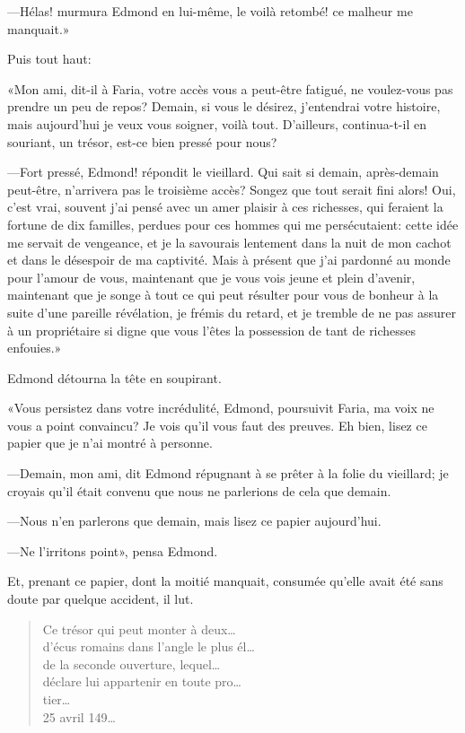 —Hélas! murmura Edmond en lui-même, le voilà retombé! ce malheur me manquait.»

Puis tout haut:

«Mon ami, dit-il à Faria, votre accès vous a peut-être fatigué, ne voulez-vous pas prendre un peu de repos? Demain, si vous le désirez, j'entendrai votre histoire, mais aujourd'hui je veux vous soigner, voilà tout. D'ailleurs, continua-t-il en souriant, un trésor, est-ce bien pressé pour nous?

—Fort pressé, Edmond! répondit le vieillard. Qui sait si demain, après-demain peut-être, n'arrivera pas le troisième accès? Songez que tout serait fini alors! Oui, c'est vrai, souvent j'ai pensé avec un amer plaisir à ces richesses, qui feraient la fortune de dix familles, perdues pour ces hommes qui me persécutaient: cette idée me servait de vengeance, et je la savourais lentement dans la nuit de mon cachot et dans le désespoir de ma captivité. Mais à présent que j'ai pardonné au monde pour l'amour de vous, maintenant que je vous vois jeune et plein d'avenir, maintenant que je songe à tout ce qui peut résulter pour vous de bonheur à la suite d'une pareille révélation, je frémis du retard, et je tremble de ne pas assurer à un propriétaire si digne que vous l'êtes la possession de tant de richesses enfouies.»

Edmond détourna la tête en soupirant.

«Vous persistez dans votre incrédulité, Edmond, poursuivit Faria, ma voix ne vous a point convaincu? Je vois qu'il vous faut des preuves. Eh bien, lisez ce papier que je n'ai montré à personne.

—Demain, mon ami, dit Edmond répugnant à se prêter à la folie du vieillard; je croyais qu'il était convenu que nous ne parlerions de cela que demain.

—Nous n'en parlerons que demain, mais lisez ce papier aujourd'hui.

—Ne l'irritons point», pensa Edmond.

Et, prenant ce papier, dont la moitié manquait, consumée qu'elle avait été sans doute par quelque accident, il lut.

\begin{quote}\oldfont
Ce trésor qui peut monter à deux\dots\\
d'écus romains dans l'angle le plus él\dots\\
de la seconde ouverture, lequel\dots\\
déclare lui appartenir en toute pro\dots\\
tier\dots\\
25 avril 149\dots
\end{quote}

